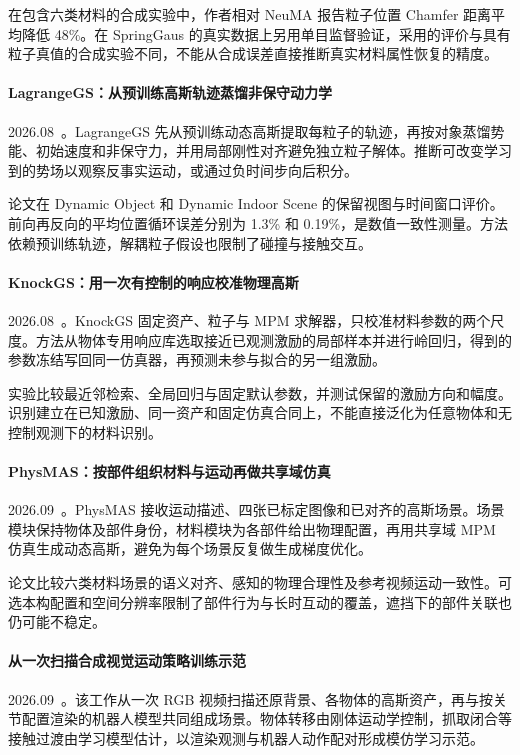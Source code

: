 在包含六类材料的合成实验中，作者相对 NeuMA 报告粒子位置 Chamfer 距离平均降低 48\%。在 SpringGaus 的真实数据上另用单目监督验证，采用的评价与具有粒子真值的合成实验不同，不能从合成误差直接推断真实材料属性恢复的精度。

\paragraph{LagrangeGS：从预训练高斯轨迹蒸馏非保守动力学}
2026.08~\cite{2608_22773}。LagrangeGS 先从预训练动态高斯提取每粒子的轨迹，再按对象蒸馏势能、初始速度和非保守力，并用局部刚性对齐避免独立粒子解体。推断可改变学习到的势场以观察反事实运动，或通过负时间步向后积分。

论文在 Dynamic Object 和 Dynamic Indoor Scene 的保留视图与时间窗口评价。前向再反向的平均位置循环误差分别为 1.3\% 和 0.19\%，是数值一致性测量。方法依赖预训练轨迹，解耦粒子假设也限制了碰撞与接触交互。

\paragraph{KnockGS：用一次有控制的响应校准物理高斯}
2026.08~\cite{2608_27365}。KnockGS 固定资产、粒子与 MPM 求解器，只校准材料参数的两个尺度。方法从物体专用响应库选取接近已观测激励的局部样本并进行岭回归，得到的参数冻结写回同一仿真器，再预测未参与拟合的另一组激励。

实验比较最近邻检索、全局回归与固定默认参数，并测试保留的激励方向和幅度。识别建立在已知激励、同一资产和固定仿真合同上，不能直接泛化为任意物体和无控制观测下的材料识别。

\paragraph{PhysMAS：按部件组织材料与运动再做共享域仿真}
2026.09~\cite{2609_07174}。PhysMAS 接收运动描述、四张已标定图像和已对齐的高斯场景。场景模块保持物体及部件身份，材料模块为各部件给出物理配置，再用共享域 MPM 仿真生成动态高斯，避免为每个场景反复做生成梯度优化。

论文比较六类材料场景的语义对齐、感知的物理合理性及参考视频运动一致性。可选本构配置和空间分辨率限制了部件行为与长时互动的覆盖，遮挡下的部件关联也仍可能不稳定。

\paragraph{从一次扫描合成视觉运动策略训练示范}
2026.09~\cite{2609_21112}。该工作从一次 RGB 视频扫描还原背景、各物体的高斯资产，再与按关节配置渲染的机器人模型共同组成场景。物体转移由刚体运动学控制，抓取闭合等接触过渡由学习模型估计，以渲染观测与机器人动作配对形成模仿学习示范。

